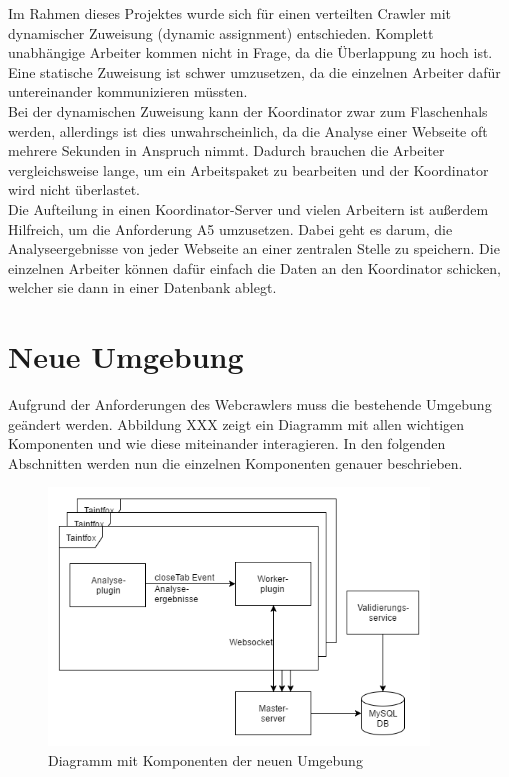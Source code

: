 Im Rahmen dieses Projektes wurde sich für einen verteilten Crawler mit dynamischer Zuweisung (dynamic assignment) entschieden. Komplett unabhängige Arbeiter kommen nicht in Frage, da die Überlappung zu hoch ist. Eine statische Zuweisung ist schwer umzusetzen, da die einzelnen Arbeiter dafür untereinander kommunizieren müssten. \\
Bei der dynamischen Zuweisung kann der Koordinator zwar zum Flaschenhals werden, allerdings ist dies unwahrscheinlich, da die Analyse einer Webseite oft mehrere Sekunden in Anspruch nimmt. Dadurch brauchen die Arbeiter vergleichsweise lange, um ein Arbeitspaket zu bearbeiten und der Koordinator wird nicht überlastet. \\
Die Aufteilung in einen Koordinator-Server und vielen Arbeitern ist außerdem Hilfreich, um die Anforderung A5 umzusetzen. Dabei geht es darum, die Analyseergebnisse von jeder Webseite an einer zentralen Stelle zu speichern. Die einzelnen Arbeiter können dafür einfach die Daten an den Koordinator schicken, welcher sie dann in einer Datenbank ablegt.


\section{Neue Umgebung}
Aufgrund der Anforderungen des Webcrawlers muss die bestehende Umgebung geändert werden. Abbildung XXX zeigt ein Diagramm mit allen wichtigen Komponenten und wie diese miteinander interagieren. In den folgenden Abschnitten werden nun die einzelnen Komponenten genauer beschrieben.

\begin{figure}
	\centering
	\includegraphics[width=0.9\textwidth]{Bilder/NeueUmgebung.png}
	\caption{Diagramm mit Komponenten der neuen Umgebung}
\end{figure}

